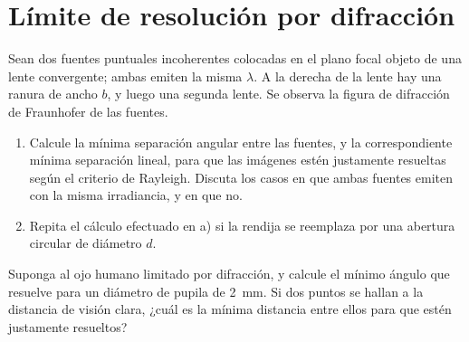 \section*{Límite de resolución por difracción}

\item Sean dos fuentes puntuales incoherentes colocadas en el plano focal objeto de una lente convergente; ambas emiten la misma $\lambda$.
A la derecha de la lente hay una ranura de ancho $b$, y luego una segunda lente.
Se observa la figura de difracción de Fraunhofer de las fuentes.
\begin{enumerate}
	\item Calcule la mínima separación angular entre las fuentes, y la correspondiente mínima separación lineal, para que las imágenes estén justamente resueltas según el criterio de Rayleigh.
	Discuta los casos en que ambas fuentes emiten con la misma irradiancia, y en que no. 
	\item Repita el cálculo efectuado en a) si la rendija se reemplaza por una abertura circular de diámetro $d$.
\end{enumerate}



\item Suponga al ojo humano limitado por difracción, y calcule el mínimo ángulo que resuelve para un diámetro de pupila de \SI{2}{\milli\metre}.
Si dos puntos se hallan a la distancia de visión clara, ¿cuál es la mínima distancia entre ellos para que estén justamente resueltos?

